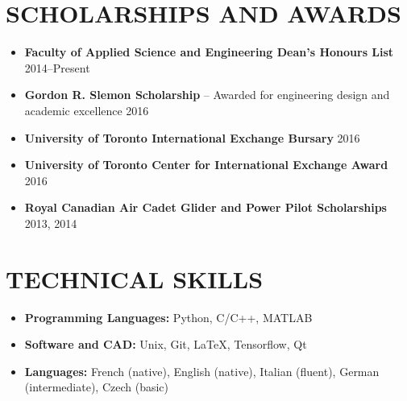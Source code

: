 \documentclass{ResumeTemplate}
\begin{document}
	\section{SCHOLARSHIPS AND AWARDS}	
	\begin{itemize}[noitemsep, leftmargin=*]
		\item \textbf{Faculty of Applied Science and Engineering Dean's Honours List} \hfill 2014--Present
		\item \textbf{Gordon R. Slemon Scholarship} -- Awarded for engineering design and academic excellence \hfill 2016
		\item \textbf{University of Toronto International Exchange Bursary} \hfill 2016
		\item \textbf{University of Toronto Center for International Exchange Award} \hfill 2016
		\item \textbf{Royal Canadian Air Cadet Glider and Power Pilot Scholarships} \hfill 2013, 2014\vspace*{-\baselineskip}
	\end{itemize}
	
	\section{TECHNICAL SKILLS}
	\raggedright
	\begin{itemize}[noitemsep, leftmargin=*]
		\item \textbf{Programming Languages:} Python, C/C++,  MATLAB \\
		\item \textbf{Software and CAD:} Unix, Git, LaTeX, Tensorflow, Qt\\
		\item \textbf{Languages:} French (native),  English (native),  Italian (fluent),  German (intermediate), Czech (basic)\vspace*{-\baselineskip}
	\end{itemize}
\end{document}
